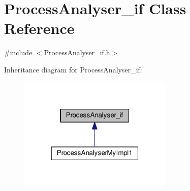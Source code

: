 \hypertarget{class_process_analyser__if}{\section{Process\-Analyser\-\_\-if Class Reference}
\label{class_process_analyser__if}
}


{\ttfamily \#include $<$Process\-Analyser\-\_\-if.\-h$>$}



Inheritance diagram for Process\-Analyser\-\_\-if\-:
\nopagebreak
\begin{figure}[H]
\begin{center}
\leavevmode
\includegraphics[width=208pt]{class_process_analyser__if__inherit__graph}
\end{center}
\end{figure}
